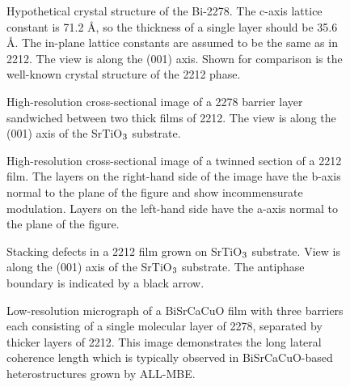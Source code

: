 \begin{figure}
\caption{Hypothetical crystal structure of the Bi-2278.  The c-axis
lattice constant is 71.2 \AA, so the thickness of a single layer
should be 35.6 \AA.  The in-plane lattice constants are assumed to be
the same as in 2212.  The view is along the (001) axis.  Shown for
comparison is the well-known crystal structure of the 2212 phase.}
\label{stick}
\end{figure}

\begin{figure}
\caption{High-resolution cross-sectional image of a 2278 barrier layer
sandwiched between two thick films of 2212.  The view is along the
(001) axis of the SrTiO$\rm _3$ substrate.}
\label{2278}
\end{figure}

\begin{figure}
\caption{High-resolution cross-sectional image of a twinned section of
a 2212 film.  The layers on the right-hand side of the image have the
b-axis normal to the plane of the figure and show incommensurate
modulation.  Layers on the left-hand side have the a-axis normal to
the plane of the figure.}
\label{twin}
\end{figure}

\begin{figure}
\caption{Stacking defects in a 2212 film grown on SrTiO$\rm _3$ substrate.
View is along the (001) axis of the SrTiO$\rm _3$ substrate.  The antiphase
boundary is indicated by a black arrow.}
\label{stack}
\end{figure}

\begin{figure}
\caption{Low-resolution micrograph of a BiSrCaCuO film with three
barriers each consisting of a single molecular layer of 2278,
separated by thicker layers of 2212.  This image demonstrates the long
lateral coherence length which is typically observed in
BiSrCaCuO-based heterostructures grown by ALL-MBE.}
\label{lowmag}
\end{figure}


